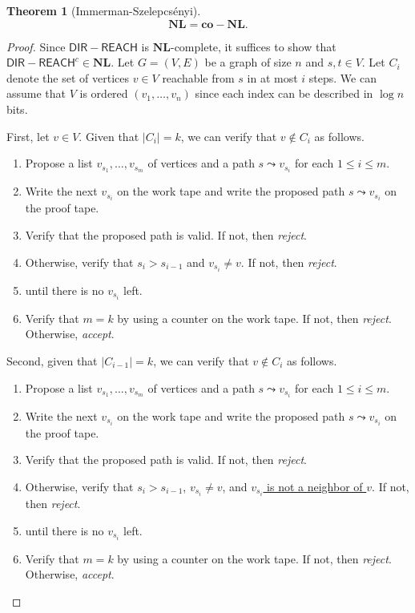 \documentclass[10pt,letterpaper,cm]{nupset}
\theoremstyle{definition}
\theoremstyle{theorem}
\newtheorem{theorem}[definition]{Theorem}
\theoremstyle{remark}
\newcommand{\1}{\mathbf{1}}
\newcommand{\0}{\vec 0}
\begin{document}
\begin{theorem}[Immerman-Szelepcs\'enyi]
$$\mathbf{NL} = \mathbf{co}{-}{\mathbf{NL}}.$$
\end{theorem}
\begin{proof}
Since $\mathsf{DIR{-}REACH}$ is $\mathbf{NL}$-complete, it suffices to show that $\mathsf{DIR{-}REACH}^c\in \mathbf{NL}.$  
Let $G= \left(V, E\right)$ be a graph of size $n$ and $s, t\in V$. Let $C_i$ denote the set of vertices $v\in V$ reachable from $s$ in at most $i$ steps. We can assume that $V$ is ordered $(v_1, \ldots, v_n)$ since each index can be described in $\log{n}$ bits.

\medskip

First, let $v\in V$. Given that $\lvert{C_i}\rvert = k$, we can verify that $v \notin C_i$ as follows. 
\begin{enumerate}
\item Propose a list $v_{s_1}, \ldots, v_{s_m}$ of vertices and a path $s\leadsto v_{s_i}$ for each $1\leq i \leq m$. 
\item Write the next $v_{s_i}$ on the work tape and write the proposed path $s \leadsto v_{s_i}$ on the proof tape. 
\item Verify that the proposed path is valid. If not, then \textit{reject}.
\item Otherwise, verify that $s_i > s_{i-1}$ and $v_{s_i} \ne v$. If not, then \textit{reject}. 
\item {} until there is no $v_{s_i}$ left. 
\item Verify that $m = k$ by using a counter on the work tape. If not, then \textit{reject}. Otherwise, \textit{accept}.
\end{enumerate}

Second, given that $\lvert{C_{i-1}}\rvert = k$,  we can verify that $v\notin C_i$ as follows.
\begin{enumerate}
\item Propose a list $v_{s_1}, \ldots, v_{s_m}$ of vertices and a path $s\leadsto v_{s_i}$ for each $1\leq i \leq m$. 
\item Write the next $v_{s_i}$ on the work tape and write the proposed path $s \leadsto v_{s_i}$ on the proof tape. 
\item Verify that the proposed path is valid. If not, then \textit{reject}.
\item Otherwise, verify that $s_i > s_{i-1}$, $v_{s_i} \ne v$, and \underline{$v_{s_i}$ is not a neighbor of $v$}. If not, then \textit{reject}. 
\item {} until there is no $v_{s_i}$ left. 
\item Verify that $m = k$ by using a counter on the work tape. If not, then \textit{reject}. Otherwise, \textit{accept}.
\end{enumerate}


\end{proof}
\end{document}

